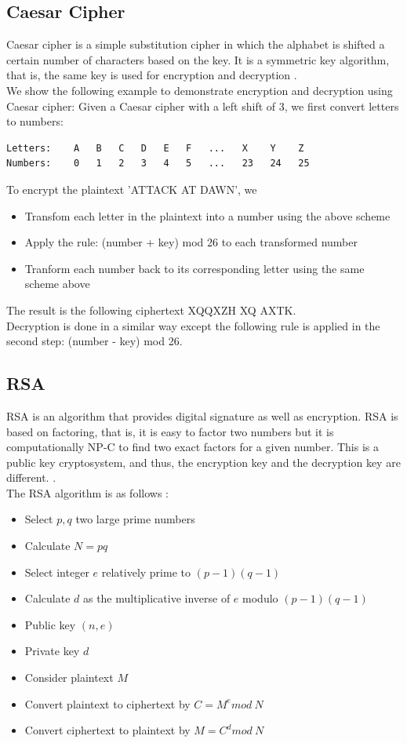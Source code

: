 \documentclass[12pt]{article}
\begin{document}
\subsection{Caesar Cipher}
Caesar cipher is a simple substitution cipher in which the alphabet is shifted a certain number of characters based on the key. It is a symmetric key algorithm, that is, the same key is used for encryption and decryption \cite{busta2002encryption}. \\
We show the following example to demonstrate encryption and decryption using Caesar cipher: 
Given a Caesar cipher with a left shift of 3, we first convert letters to numbers:
\begin{lstlisting}
Letters: 	A   B   C   D   E   F   ...   X    Y    Z
Numbers: 	0   1   2   3   4   5   ...   23   24   25
\end{lstlisting}
To encrypt the plaintext 'ATTACK AT DAWN', we
\begin{itemize}
\item Transfom each letter in the plaintext into a number using the above scheme
\item Apply the rule: (number + key) mod 26 to each transformed number
\item Tranform each number back to its corresponding letter using the same scheme above
\end{itemize}
The result is the following ciphertext XQQXZH XQ AXTK. \\ 
Decryption is done in a similar way except the following rule is applied in the second step: (number - key) mod 26.

\subsection{RSA}
RSA is an algorithm that provides digital signature as well as encryption. RSA is based on factoring, that is, it is easy to factor two numbers but it is computationally NP-C to find two exact factors for a given number. This is a public key cryptosystem, and thus, the encryption key and the decryption key are different. \cite{rsaIntro}. \\
The RSA algorithm is as follows \cite{rsaSteps}:

\begin{itemize}
\item Select $p, q$ two large prime numbers
\item Calculate $N = pq$
\item Select integer $e$ relatively prime to $(p-1)(q-1)$
\item Calculate $d$ as the multiplicative inverse of $e$ modulo $(p-1)(q-1)$
\item Public key $(n, e)$
\item Private key $d$
\item Consider plaintext $M$
\item Convert plaintext to ciphertext by $C=M^{e}mod\ N$
\item Convert ciphertext to plaintext by $M=C^{d}mod\ N$
\end{itemize}
\end{document}
